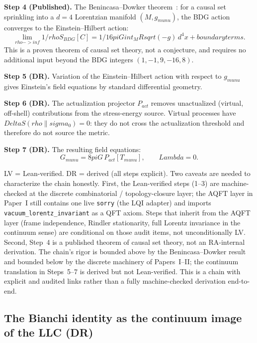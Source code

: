 \documentclass[11pt]{article}
\def\Delta{Delta}%
\def\Lambda{Lambda}%
\def\rho{rho}%
\def\sigma{sigma}%
\def\mu{mu}%
\def\nu{nu}%
\def\pi{pi}%
\def\mathrm#1{#1}%
\def\mathcal#1{#1}%
\def\text#1{#1}%
\def\sqrt#1{sqrt(#1)}%
\def\frac#1#2{#1/#2}%
\def\to{->}%
\def\infty{inf}%
\def\int{int}%
\begin{document}
\textbf{Step 4 (Published).} The Benincasa--Dowker theorem~\cite{Benincasa2010}: for a causal set sprinkling into a $d=4$ Lorentzian manifold $(\mathcal{M}, g_{\mu\nu})$, the BDG action converges to the Einstein--Hilbert action:
\begin{equation}
\lim_{\rho \to \infty} \frac{1}{\rho} S_{\mathrm{BDG}}[C] = \frac{1}{16\pi G} \int_{\mathcal{M}} R\sqrt{-g}\,d^4x + \text{boundary terms}.
\end{equation}
This is a proven theorem of causal set theory, not a conjecture, and requires no additional input beyond the BDG integers $(1, -1, 9, -16, 8)$.

\textbf{Step 5 (DR).} Variation of the Einstein--Hilbert action with respect to $g_{\mu\nu}$ gives Einstein's field equations by standard differential geometry.

\textbf{Step 6 (DR).} The actualization projector $P_{\mathrm{act}}$ removes unactualized (virtual, off-shell) contributions from the stress-energy source. Virtual processes have $\Delta S(\rho \| \sigma_0) = 0$: they do not cross the actualization threshold and therefore do not source the metric.

\textbf{Step 7 (DR).} The resulting field equations:
\begin{equation}
\label{eq:einstein}
\boxed{G_{\mu\nu} = 8\pi G\, P_{\mathrm{act}}[T_{\mu\nu}], \qquad \Lambda = 0.}
\end{equation}

LV = Lean-verified. DR = derived (all steps explicit). Two caveats are needed to characterize the chain honestly. First, the Lean-verified steps (1--3) are machine-checked at the discrete combinatorial / topology-closure layer; the AQFT layer in Paper~I still contains one live \texttt{sorry} (the LQI adapter) and imports \texttt{vacuum\_lorentz\_invariant} as a QFT axiom. Steps that inherit from the AQFT layer (frame independence, Rindler stationarity, full Lorentz invariance in the continuum sense) are conditional on those audit items, not unconditionally LV. Second, Step~4 is a published theorem of causal set theory, not an RA-internal derivation. The chain's rigor is bounded above by the Benincasa--Dowker result and bounded below by the discrete machinery of Papers~I--II; the continuum translation in Steps~5--7 is derived but not Lean-verified. This is a chain with explicit and audited links rather than a fully machine-checked derivation end-to-end.

\subsection{The Bianchi identity as the continuum image of the LLC (DR)}
\label{sec:bianchi_is_llc}
\end{document}
